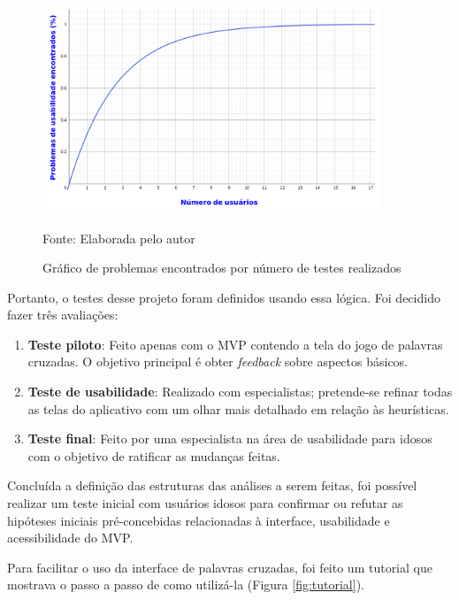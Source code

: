 \begin{figure}[H]
\centering
    \caption{Gráfico de problemas encontrados por número de testes realizados}
    \label{fig:graphnielsen}
    \includegraphics[width=0.9\textwidth]{Figuras/graphNielsen.png}
    
    Fonte: Elaborada pelo autor
\end{figure}

Portanto, o testes desse projeto foram definidos usando essa lógica. Foi decidido fazer três avaliações:

\begin{enumerate}
    \item \textbf{Teste piloto}: Feito apenas com o MVP contendo a tela do jogo de palavras cruzadas. O objetivo principal é obter \textit{feedback} sobre aspectos básicos.
    \item \textbf{Teste de usabilidade}: Realizado com especialistas; pretende-se refinar todas as telas do aplicativo com um olhar mais detalhado em relação às heurísticas.
    \item \textbf{Teste final}: Feito por uma especialista na área de usabilidade para idosos com o objetivo de ratificar as mudanças feitas.
\end{enumerate}

    Concluída a definição das estruturas das análises a serem feitas, foi possível realizar um teste inicial com usuários idosos para confirmar ou refutar as hipóteses iniciais pré-concebidas relacionadas à interface, usabilidade e acessibilidade do MVP.

Para facilitar o uso da interface de palavras cruzadas, foi feito um tutorial que mostrava o passo a passo de como utilizá-la (Figura \ref{fig:tutorial}). 

